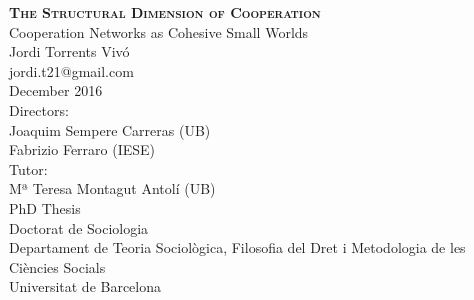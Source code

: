 \begin{titlingpage}
\begin{center}
{\HUGE \textsc{\textbf{The Structural Dimension of Cooperation}}}\\[1cm]
{\LARGE Cooperation Networks as Cohesive Small Worlds}\\[2cm]
{\Large Jordi Torrents Vivó} \\
{\large jordi.t21@gmail.com}\\[1cm]
{\Large December 2016}\\[4cm]
{\large Directors:} \\[0.2cm]
{\Large Joaquim Sempere Carreras (UB)} \\[0.2cm]
{\Large Fabrizio Ferraro (IESE)} \\[0.5cm]
{\large Tutor:} \\[0.2cm]
{\Large Mª Teresa Montagut Antolí (UB)} \\[1.5cm]
{\LARGE PhD Thesis}\\[0.5cm]
{\LARGE Doctorat de Sociologia}\\[1cm]
{\Large Departament de Teoria Sociològica, Filosofia del Dret i Metodologia de les Ciències Socials} \\[0.5cm]
{\LARGE Universitat de Barcelona}\\
\end{center}
\end{titlingpage}
\cleardoublepage
